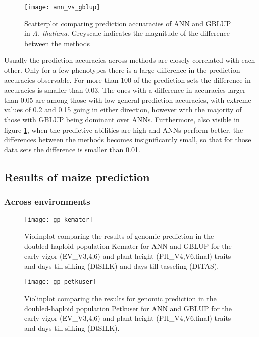 \begin{figure}[H]
  \centering
  \texttt{[image: ann\_vs\_gblup]}
  \decoRule
  \caption[Scatterplot comparing prediction accuaracies of ANN and GBLUP in
  \textit{A. thaliana}]{Scatterplot comparing prediction accuaracies of ANN and GBLUP in
    \textit{A. thaliana}. Greyscale indicates the magnitude of the difference between the
    methods}
\label{fig:annblup}
\end{figure}

Usually the prediction accuracies across methods are closely correlated with each other.
Only for a few phenotypes there is a large difference in the prediction accuracies
observable. For more than 100 of the prediction sets the difference in accuracies is
smaller than 0.03. The ones with a difference in accuracies larger than 0.05 are among
those with low general prediction accuracies, with extreme values of 0.2 and 0.15 going in
either direction, however with the majority of those with GBLUP being dominant over
ANNs. Furthermore, also visible in figure \ref{fig:annblup}, when the predictive abilities
are high and ANNs perform better, the differences between the methods becomes
insignificantly small, so that for those data sets the difference is smaller than 0.01.

\subsection{Results of maize prediction}
\subsubsection{Across environments}

\begin{figure}[H]
 \centering \texttt{[image: gp\_kemater]}
 \decoRule
 \caption[Violinplot comparing the results for GP in the DH population Kemater for ANN and
 GBLUP]{Violinplot comparing the results of genomic prediction in the doubled-haploid
   population Kemater for ANN and GBLUP for the early vigor (EV\_V3,4,6) and plant height
   (PH\_V4,V6,final) traits and days till silking (DtSILK) and days till tasseling (DtTAS). }
\label{fig:ke_ann}
\end{figure}

\begin{figure}[H]
 \centering \texttt{[image: gp\_petkuser]}
 \decoRule
 \caption[Violinplot comparing the results for GP in the DH population Petkuser for ANN
 and GBLUP]{Violinplot comparing the results for genomic prediction in the doubled-haploid
   population Petkuser for ANN and GBLUP for the early vigor (EV\_V3,4,6) and plant height
   (PH\_V4,V6,final) traits and days till silking (DtSILK). }
\label{fig:pe_ann}
\end{figure}

